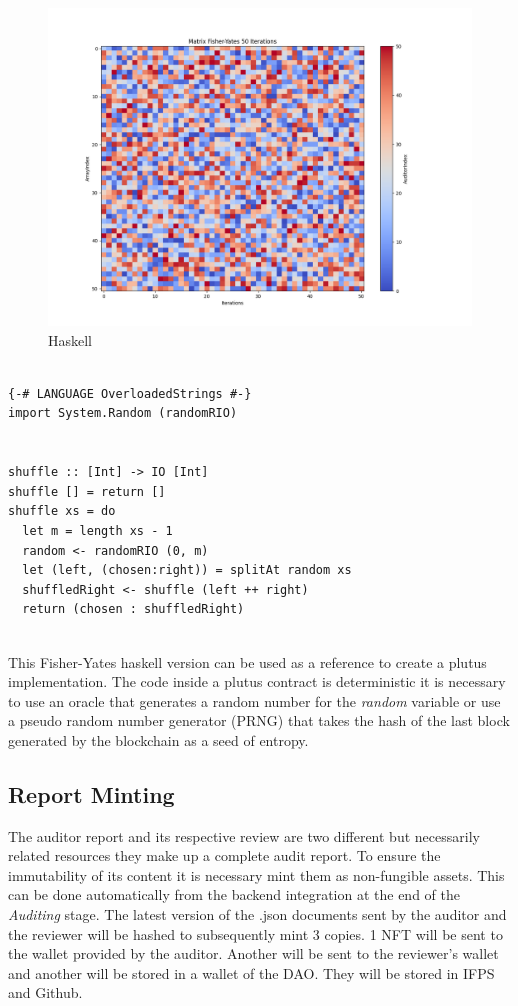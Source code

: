 \documentclass[12pt]{article}
\begin{document}
\begin{figure}[ht]
  \centering
  \includegraphics[width=1\textwidth]{haskell-matrix.png}
  \caption{Haskell
  }
  \label{fig:haskell-matrix}
\end{figure}


\begin{tcolorbox}[title=Haskell Code]
\begin{verbatim}

{-# LANGUAGE OverloadedStrings #-}
import System.Random (randomRIO)


shuffle :: [Int] -> IO [Int]
shuffle [] = return []
shuffle xs = do
  let m = length xs - 1
  random <- randomRIO (0, m)
  let (left, (chosen:right)) = splitAt random xs
  shuffledRight <- shuffle (left ++ right)
  return (chosen : shuffledRight)


\end{verbatim}
\end{tcolorbox}


This Fisher-Yates haskell version can be used as a reference to create a plutus implementation. The code inside a plutus contract is deterministic it is necessary to use an oracle that generates a random number for the \emph {random} variable or use a pseudo random number generator (PRNG) that takes the hash of the last block generated by the blockchain as a seed of entropy.

\subsection { Report Minting }

The auditor report and its respective review are two different but necessarily related resources they make up a complete audit report. To ensure the immutability of its content it is necessary mint them as non-fungible assets. This can be done automatically from the backend integration at the end of the \emph{Auditing} stage. 
The latest version of the .json documents sent by the auditor and the reviewer will be hashed to subsequently mint 3 copies. 1 NFT will be sent to the wallet provided by the auditor. Another will be sent to the reviewer's wallet and another will be stored in a wallet of the DAO. They will be stored in IFPS and Github.
\end{document}
